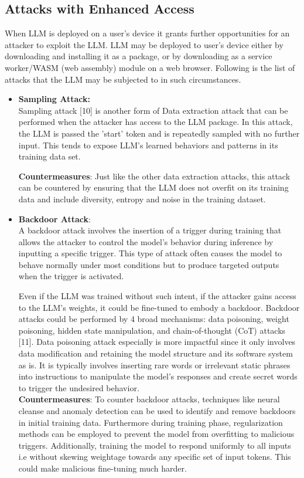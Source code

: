 \documentclass[12pt]{article}
\begin{document}
    \subsection{Attacks with Enhanced Access}
    When LLM is deployed on a user's device it grants further opportunities for an attacker to exploit the LLM. LLM may be deployed to user's device either by downloading and installing it as a package, or by downloading as a service worker/WASM (web assembly) module on a web browser. Following is the list of attacks that the LLM may be subjected to in such circumstances.
    \begin{itemize}
        \item \textbf{Sampling Attack:} \\
        Sampling attack [10] is another form of Data extraction attack that can be performed when the attacker has access to the LLM package. In this attack, the LLM is passed the 'start' token and is repeatedly sampled with no further input. This tends to expose LLM's learned behaviors and patterns in its training data set.

        \textbf{Countermeasures}: Just like the other data extraction attacks, this attack can be countered by ensuring that the LLM does not overfit on its training data and include diversity, entropy and noise in the training dataset.

        \item \textbf{Backdoor Attack}: \\
        A backdoor attack involves the insertion of a trigger during training that allows the attacker to control the model’s behavior during inference by inputting a specific trigger. This type of attack often causes the model to behave normally under most conditions but to produce targeted outputs when the trigger is activated.

        Even if the LLM was trained without such intent, if the attacker gains access to the LLM's weights, it could be fine-tuned to embody a backdoor. Backdoor attacks could be performed by 4 broad mechanisms: data poisoning, weight poisoning, hidden state manipulation, and chain-of-thought (CoT) attacks [11]. Data poisoning attack especially is more impactful since it only involves data modification and retaining the model structure and its software system as is. It is typically involves inserting rare words or irrelevant static phrases into instructions
        to manipulate the model’s responses and create secret words to trigger the undesired behavior. \\
        \textbf{Countermeasures}: To counter backdoor attacks, techniques like neural cleanse and anomaly detection can be used to identify and remove backdoors in initial training data. Furthermore during training phase, regularization methods can be employed to prevent the model from overfitting to malicious triggers. Additionally, training the model to respond uniformly to all inputs i.e without skewing weightage towards any specific set of input tokens. This could make malicious fine-tuning much harder.\\


\end{itemize}
\end{document}
